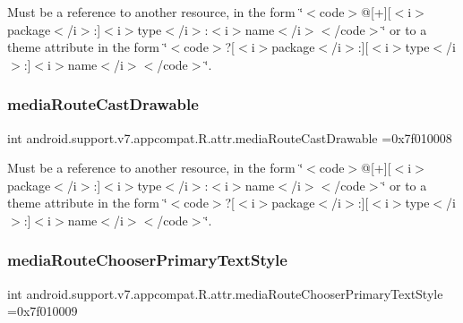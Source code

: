 Must be a reference to another resource, in the form \char`\"{}$<$code$>$@\mbox{[}+\mbox{]}\mbox{[}$<$i$>$package$<$/i$>$\+:\mbox{]}$<$i$>$type$<$/i$>$\+:$<$i$>$name$<$/i$>$$<$/code$>$\char`\"{} or to a theme attribute in the form \char`\"{}$<$code$>$?\mbox{[}$<$i$>$package$<$/i$>$\+:\mbox{]}\mbox{[}$<$i$>$type$<$/i$>$\+:\mbox{]}$<$i$>$name$<$/i$>$$<$/code$>$\char`\"{}. \mbox{\label{classandroid_1_1support_1_1v7_1_1appcompat_1_1R_1_1attr_a0f07391bf841dd7c94d92679c2d1eb89}} 
\subsubsection{\texorpdfstring{media\+Route\+Cast\+Drawable}{mediaRouteCastDrawable}}
{\footnotesize\ttfamily int android.\+support.\+v7.\+appcompat.\+R.\+attr.\+media\+Route\+Cast\+Drawable =0x7f010008\hspace{0.3cm}{\ttfamily [static]}}

Must be a reference to another resource, in the form \char`\"{}$<$code$>$@\mbox{[}+\mbox{]}\mbox{[}$<$i$>$package$<$/i$>$\+:\mbox{]}$<$i$>$type$<$/i$>$\+:$<$i$>$name$<$/i$>$$<$/code$>$\char`\"{} or to a theme attribute in the form \char`\"{}$<$code$>$?\mbox{[}$<$i$>$package$<$/i$>$\+:\mbox{]}\mbox{[}$<$i$>$type$<$/i$>$\+:\mbox{]}$<$i$>$name$<$/i$>$$<$/code$>$\char`\"{}. \mbox{\label{classandroid_1_1support_1_1v7_1_1appcompat_1_1R_1_1attr_a02ad3e1799be719791afeb4555226ef0}} 
\subsubsection{\texorpdfstring{media\+Route\+Chooser\+Primary\+Text\+Style}{mediaRouteChooserPrimaryTextStyle}}
{\footnotesize\ttfamily int android.\+support.\+v7.\+appcompat.\+R.\+attr.\+media\+Route\+Chooser\+Primary\+Text\+Style =0x7f010009\hspace{0.3cm}{\ttfamily [static]}}

